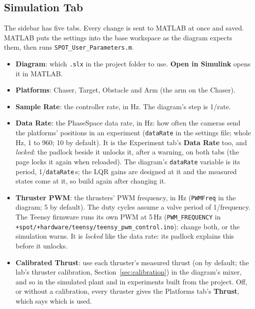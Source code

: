 \documentclass[11pt,a4paper]{article}
\newcommand{\ui}[1]{\textsf{\textbf{#1}}}
\newcommand{\pth}[1]{\texttt{#1}}
\begin{document}
\subsection{Simulation Tab}
The sidebar has five tabs. Every change is sent to MATLAB at once and saved. MATLAB puts the settings into the
base workspace as the diagram expects them, then runs \pth{SPOT\_User\_Parameters.m}.

\begin{description}[leftmargin=1em]
  \item[Scenario.]
    \begin{itemize}
      \item \ui{Diagram}: which \pth{.slx} in the project folder to use. \ui{Open in Simulink} opens it in MATLAB.
      \item \ui{Platforms}: Chaser, Target, Obstacle and Arm (the arm on the Chaser).
      \item \ui{Sample Rate}: the controller rate, in Hz. The diagram's step is 1/rate.
      \item \ui{Data Rate}: the PhaseSpace data rate, in Hz: how often the cameras send the platforms' positions in an
            experiment (\texttt{dataRate} in the settings file; whole Hz, 1 to 960; 10 by default). It is the Experiment
            tab's \ui{Data Rate} too, and \emph{locked}: the padlock beside it unlocks it, after a warning, on both tabs
            (the page locks it again when reloaded). The diagram's \texttt{dataRate} variable is its period,
            1/\texttt{dataRate}\,s; the LQR gains are designed at it and the measured states come at it, so build again
            after changing it.
      \item \ui{Thruster PWM}: the thrusters' PWM frequency, in Hz (\texttt{PWMFreq} in the diagram; 5 by default). The
            duty cycles assume a valve period of 1/frequency. The Teensy firmware runs its own PWM at 5\,Hz
            (\texttt{PWM\_FREQUENCY} in \pth{+spot/+hardware/teensy/teensy\_pwm\_control.ino}): change both, or the
            simulation warns. It is \emph{locked} like the data rate: its padlock explains this before it unlocks.
      \item \ui{Calibrated Thrust}: use each thruster's measured thrust (on by default; the lab's thruster calibration,
            Section~\ref{sec:calibration}) in the diagram's mixer, and so in the simulated plant and in experiments
            built from the project. Off, or without a calibration, every thruster gives the Platforms tab's
            \ui{Thrust}, which says which is used.

\end{itemize}
\end{description}
\end{document}
